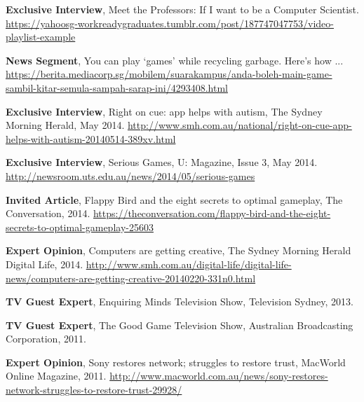 \documentclass[10pt,a4paper]{article}
\renewenvironment{itemize}{
  \begin{list}{}{
    \setlength{\leftmargin}{1.5em}
    \setlength{\itemsep}{0.25em}
    \setlength{\parskip}{0pt}
    \setlength{\parsep}{0.25em}
  }
}{
  \end{list}
}
\begin{document}
\begin{itemize}

    \item \textbf{Exclusive Interview}, Meet the Professors: If I want to be a Computer Scientist. \url{https://yahoosg-workreadygraduates.tumblr.com/post/187747047753/video-playlist-example} 

    \item \textbf{News Segment}, You can play `games' while recycling garbage. Here's how ... \url{https://berita.mediacorp.sg/mobilem/suarakampus/anda-boleh-main-game-sambil-kitar-semula-sampah-sarap-ini/4293408.html} 

    \item \textbf{Exclusive Interview}, Right on cue: app helps with autism, The Sydney Morning Herald, May 2014. \url{http://www.smh.com.au/national/right-on-cue-app-helps-with-autism-20140514-389xv.html}

    \item \textbf{Exclusive Interview}, Serious Games, U: Magazine, Issue 3, May 2014. \url{http://newsroom.uts.edu.au/news/2014/05/serious-games}

\item \textbf{Invited Article}, Flappy Bird and the eight secrets to optimal gameplay, The Conversation, 2014. \url{https://theconversation.com/flappy-bird-and-the-eight-secrets-to-optimal-gameplay-25603}

\item \textbf{Expert Opinion}, Computers are getting creative, The Sydney Morning Herald Digital Life, 2014. \url{http://www.smh.com.au/digital-life/digital-life-news/computers-are-getting-creative-20140220-331n0.html}

\item \textbf{TV Guest Expert}, Enquiring Minds Television Show, Television Sydney, 2013.

\item \textbf{TV Guest Expert}, The Good Game Television Show, Australian Broadcasting Corporation, 2011.

\item \textbf{Expert Opinion}, Sony restores network; struggles to restore trust, MacWorld Online Magazine, 2011. \url{http://www.macworld.com.au/news/sony-restores-network-struggles-to-restore-trust-29928/}

\end{itemize}

\end{document}
